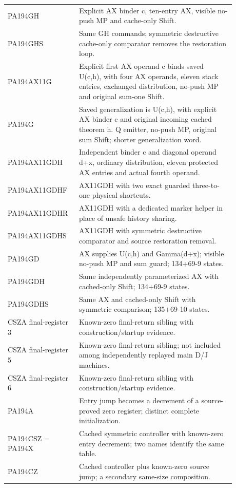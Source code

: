 \begin{longtable}{p{0.24\linewidth}p{0.64\linewidth}}
PA194GH & Explicit AX binder c, ten-entry AX, visible no-push MP and cache-only Shift.\\[4pt]
PA194GHS & Same GH commands; symmetric destructive cache-only comparator removes the restoration loop.\\[4pt]
PA194AX11G & Explicit first AX operand c binds saved U(c,h), with four AX operands, eleven stack entries, exchanged distribution, no-push MP and original sum-one Shift.\\[4pt]
PA194G & Saved generalization is U(c,h), with explicit AX binder c and original incoming cached theorem h. Q emitter, no-push MP, original sum Shift; shorter generalization word.\\[4pt]
PA194AX11GDH & Independent binder c and diagonal operand d+x, ordinary distribution, eleven protected AX entries and actual fourth operand.\\[4pt]
PA194AX11GDHF & AX11GDH with two exact guarded three-to-one physical shortcuts.\\[4pt]
PA194AX11GDHR & AX11GDH with a dedicated marker helper in place of unsafe history sharing.\\[4pt]
PA194AX11GDHS & AX11GDH with symmetric destructive comparator and source restoration removal.\\[4pt]
PA194GD & AX supplies U(c,h) and Gamma(d+x); visible no-push MP and sum guard; 134+69-9 states.\\[4pt]
PA194GDH & Same independently parameterized AX with cached-only Shift; 134+69-9 states.\\[4pt]
PA194GDHS & Same AX and cached-only Shift with symmetric comparison; 135+69-10 states.\\[4pt]
CSZA final-register 3 & Known-zero final-return sibling with construction/startup evidence.\\[4pt]
CSZA final-register 5 & Known-zero final-return sibling; not included among independently replayed main D/J machines.\\[4pt]
CSZA final-register 6 & Known-zero final-return sibling with construction/startup evidence.\\[4pt]
PA194A & Entry jump becomes a decrement of a source-proved zero register; distinct complete initialization.\\[4pt]
PA194CSZ = PA194X & Cached symmetric controller with known-zero entry decrement; two names identify the same table.\\[4pt]
PA194CZ & Cached controller plus known-zero source jump; a secondary same-size composition.\\[4pt]

\end{longtable}
